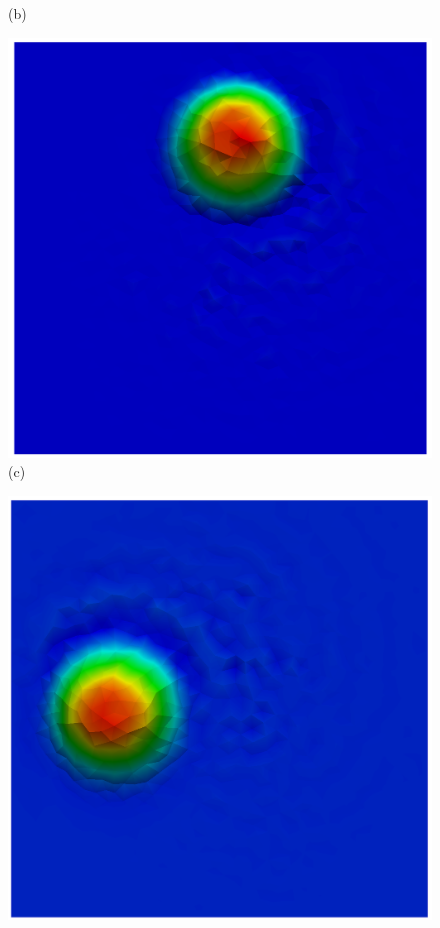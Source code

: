 \begin{figure}[H]
\begin{minipage}{.5\linewidth}
      (b)
     \end{minipage}
     \begin{minipage}{.5\linewidth}
      \centering
      \includegraphics[scale=0.2]{./02_chaps/cap_validation/figure/taylor_600.png}\\
      (c)
     \end{minipage}%
     \begin{minipage}{.5\linewidth}
      \centering
      \includegraphics[scale=0.2]{./02_chaps/cap_validation/figure/taylor_950.png}\\

\end{minipage}
\end{figure}
